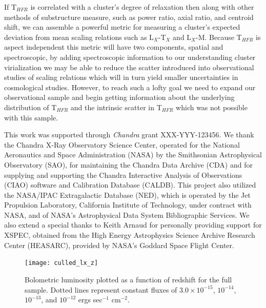 \documentclass{emulateapj}
\newcommand{\tf}{T$_{HFR}$ }
\begin{document}
If \tf is correlated with a cluster's degree of relaxation then along
with other methods of substructure measure, such as power ratio, axial
ratio, and centroid shift, we can assemble a powerful metric for
measuring a cluster's expected deviation from mean scaling relations
such as L$_X$-T$_X$ and L$_X$-M. Because \tf is aspect independent
this metric will have two components, spatial and spectroscopic,
by adding spectroscopic information to our understanding cluster
virialization we may be able to reduce the scatter introduced into
observational studies of scaling relations which will in turn yield
smaller uncertainties in cosmological studies. However, to reach such
a lofty goal we need to expand our observational sample and begin
getting information about the underlying distribution of \tf and the
intrinsic scatter in \tf which was not possible with this sample.

\acknowledgements
This work was supported through {\textit{Chandra}} grant
XXX-YYY-123456. We thank the Chandra X-Ray Observatory Science Center,
operated for the National Aeronautics and Space Administration (NASA)
by the Smithsonian Astrophysical Observatory (SAO), for maintaining
the Chandra Data Archive (CDA) and for supplying and supporting the
Chandra Interactive Analysis of Observations (CIAO) software and
Calibration Database (CALDB). This project also utilized the NASA/IPAC
Extragalactic Database (NED), which is operated by the Jet Propulsion
Laboratory, California Institute of Technology, under contract with
NASA, and of NASA's Astrophysical Data System Bibliographic
Services. We also extend a special thanks to Keith Arnaud for
personally providing support for XSPEC, obtained from the High Energy
Astrophysics Science Archive Research Center (HEASARC), provided by
NASA's Goddard Space Flight Center.




\clearpage
\begin{figure}[htp]
\begin{center}
\texttt{[image: culled\_lx\_z]}
\caption{\small Bolometric luminosity plotted as a function of redshift for the
full sample. Dotted lines represent constant fluxes of $3.0\times10^{-15}$,
$10^{-14}$, $10^{-13}$, and $10^{-12}$ ergs sec$^{-1}$ cm$^{-2}$.}
\label{fig:lx_z}
\end{center}
\end{figure}
\end{document}
